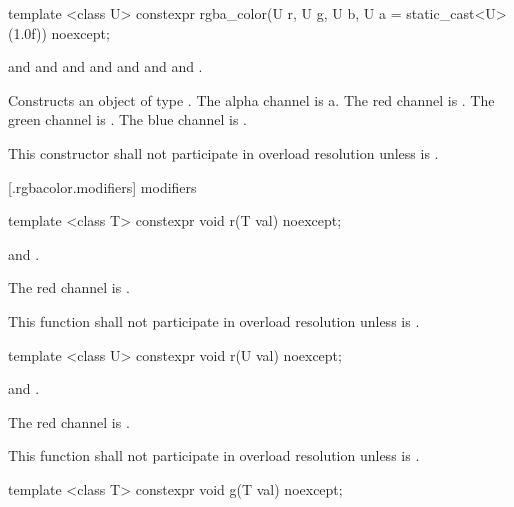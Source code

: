 %
\begin{itemdecl}
template <class U>
constexpr rgba_color(U r, U g, U b, U a = static_cast<U>(1.0f)) noexcept;
\end{itemdecl}
\begin{itemdescr}
\pnum
\requires
{} and  and  and  and  and  and  and .

\pnum
\effects
Constructs an object of type . The alpha channel is {a}. The red channel is . The green channel is . The blue channel is .

\pnum
\remarks
This constructor shall not participate in overload resolution unless  is .
\end{itemdescr}


 [\iotwod.rgbacolor.modifiers]{ modifiers}

%
\begin{itemdecl}
template <class T>
constexpr void r(T val) noexcept;
\end{itemdecl}
\begin{itemdescr}
\pnum
\requires
{} and .

\pnum
\effects
The red channel is .

\pnum
\remarks
This function shall not participate in overload resolution unless  is .
\end{itemdescr}

%
\begin{itemdecl}
template <class U>
constexpr void r(U val) noexcept;
\end{itemdecl}
\begin{itemdescr}
\pnum
\requires
{} and .

\pnum
\effects
The red channel is .

\pnum
\remarks
This function shall not participate in overload resolution unless  is .
\end{itemdescr}

%
\begin{itemdecl}
template <class T>
constexpr void g(T val) noexcept;
\end{itemdecl}

